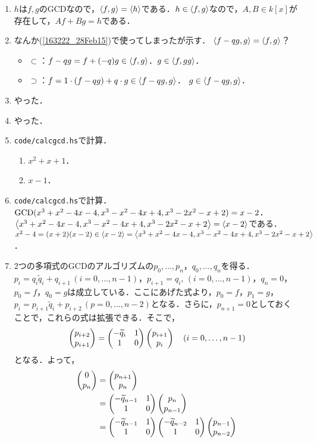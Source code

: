\documentclass[9pt]{ltjsarticle}
\begin{document}
\begin{enumerate}[label=(問題\arabic*)]
 \item $h$は$f,g$のGCDなので，$\left\langle f,g \right\rangle=\left\langle h \right\rangle$である．$h\in \left\langle f,g \right\rangle$なので，$A,B\in k[x]$が存在して，$Af+Bg = h$である．
 \item なんか(\ref{163222_28Feb15})で使ってしまったが示す．
$\left\langle f-qg,g \right\rangle=\left\langle f,g \right\rangle$？
\begin{itemize}
 \item $\subset$：$f-qg = f + (-q)g \in \left\langle f,g \right\rangle$．$g \in \left\langle f,gg \right\rangle$．
 \item $\supset$：$f = 1\cdot (f-qg) + q\cdot g \in \left\langle f-qg,g \right\rangle$．
$g \in \left\langle f-qg,g \right\rangle$．
\end{itemize}
 \item やった．
 \item やった．
 \item {\tt code/calcgcd.hs}で計算．
\begin{enumerate}[label=(\alph*)]
 \item $x^2 + x + 1$．
 \item $x-1$．
\end{enumerate}
 \item {\tt code/calcgcd.hs}で計算．
       ${\rm GCD}(x^3+x^2-4x-4,x^3-x^2-4x+4,x^3-2x^2-x+2)=x-2$．
$\left\langle x^3+x^2-4x-4,x^3-x^2-4x+4,x^3-2x^2-x+2 \right\rangle=\left\langle x-2 \right\rangle$である．$x^2-4 = (x+2)(x-2)\in \left\langle x-2 \right\rangle= \left\langle x^3+x^2-4x-4,x^3-x^2-4x+4,x^3-2x^2-x+2 \right\rangle$．
 \item 2つの多項式のGCDのアルゴリズムの$p_0,\dots,p_n$，$q_0,\dots,q_n$を得る．
$p_i = q_i \tilde q_i + q_{i+1}\,(i=0,\dots,n-1)$，$p_{i+1}=q_i,\,(i=0,\dots,n-1)$，$q_n=0$，$p_0 = f$，$q_0=g$は成立している．ここにあげた式より，$p_0=f$，$p_1 = g$，$p_i = p_{i+1}\tilde q_i + p_{i+2}\,(p=0,\dots,n-2)$となる．さらに，$p_{n+1}=0$としておくことで，これらの式は拡張できる．そこで，
\begin{align}
\left(\begin{matrix} p_{i+2} \\ p_{i+1} \end{matrix}\right) =
\begin{pmatrix}
 -\widetilde q_i & 1\\
 1 & 0
\end{pmatrix}
\left(\begin{matrix} p_{i+1} \\ p_i \end{matrix}\right) \quad (i=0,\dots,n-1)
\end{align}
となる．よって，
\begin{align}
 \tatev{0 \\ p_n} &= \tatev{p_{n+1} \\ p_n}\\
 &=
\gcdm{-\tilde q_{n-1}}\tatev{p_n \\ p_{n-1}}\\
&=
\gcdm{-\tilde q_{n-1}}\gcdm{-\tilde q_{n-2}}\tatev{p_{n-1} \\ p_{n-2}}\\

\end{align}
\end{enumerate}
\end{document}
